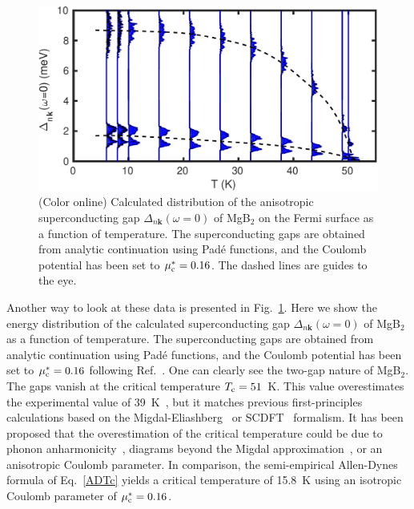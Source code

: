\documentclass[final,3p,times,twocolumn]{elsarticle}
\begin{document}
\begin{figure}[b!]
  \centering
  \includegraphics[width=0.99\linewidth]{MgB2_gaps.pdf}
  \caption{\label{gaps-MgB2} (Color online) Calculated distribution of the anisotropic superconducting gap $\Delta_{n\mathbf{k}}(\omega=0)$ of MgB$_2$ on the Fermi surface as a function of temperature. The superconducting gaps are obtained from analytic continuation using Pad\'e functions, and the Coulomb potential has been set to $\mu_{\rm c}^*=0.16$. The dashed lines are guides to the eye.}
\end{figure}



Another way to look at these data is presented in Fig.~\ref{gaps-MgB2}. Here we show the energy distribution of the calculated superconducting gap $\Delta_{n\mathbf{k}}(\omega=0)$ of MgB$_2$ as a function of temperature. The superconducting gaps are obtained from analytic continuation using Pad\'e functions, and the Coulomb potential has been set to $\mu_{\rm c}^*=0.16$ following Ref.~\cite{Margine2013}. 
One can clearly see the two-gap nature of MgB$_2$.
The gaps vanish at the critical temperature $T_{\rm c}=51$~K. This value overestimates the experimental value of 39~K~\cite{Nagamatsu2001}, but it matches previous first-principles calculations based on the Migdal-Eliashberg~\cite{Choi2002,Margine2013} or SCDFT~\cite{Floris2005} formalism.
It has been proposed that the overestimation of the critical temperature could be due to phonon anharmonicity~\cite{Choi2002}, diagrams beyond the Migdal approximation~\cite{Cappelluti2002,Pickett2003,Saitta2008,Calandra2010}, or an anisotropic Coulomb parameter. 
In comparison, the semi-empirical Allen-Dynes formula of Eq.~\eqref{ADTc} yields a critical temperature of 15.8~K using an isotropic Coulomb parameter of $\mu_{\rm c}^*=0.16$.

\end{document}
